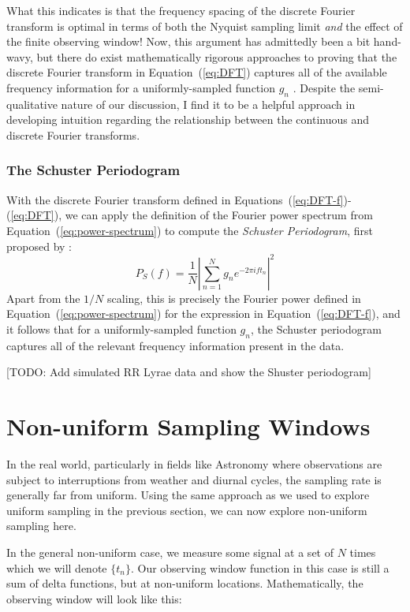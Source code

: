\documentclass[preprint]{aastex}
\newcommand{\todo}[1]{{\color{red} [TODO: #1]}}
\newcommand{\Eq}[1]{Equation~(\ref{eq:#1})}
\newcommand{\eq}[1]{\Eq{#1}}
\newcommand{\eqs}[2]{Equations~(\ref{eq:#1})-(\ref{eq:#2})}
\newcommand{\eqlabel}[1]{\label{eq:#1}}
\begin{document}
What this indicates is that the frequency spacing of the discrete Fourier
transform is optimal in terms of both the Nyquist sampling limit
{\it and} the effect of the finite observing window!
Now, this argument has admittedly been a bit hand-wavy, but there do exist
mathematically rigorous approaches to proving that the discrete Fourier
transform in \eq{DFT} captures all of the available frequency information
for a uniformly-sampled function $g_n$
\citep[see, e.g.][]{FoundationsOfSignalProcessing}.
Despite the semi-qualitative nature of our discussion,
I find it to be a helpful approach
in developing intuition regarding the relationship between the
continuous and discrete Fourier transforms.

\subsubsection{The Schuster Periodogram}

With the discrete Fourier transform defined in \eqs{DFT-f}{DFT}, we can
apply the definition of the Fourier power spectrum from \eq{power-spectrum}
to compute the {\it Schuster Periodogram}, first proposed by \citet{Schuster98}:
\begin{equation}
  P_S(f) = \frac{1}{N}\left|\sum_{n=1}^N g_n e^{-2\pi i f t_n}\right|^2
  \eqlabel{schuster-periodogram}
\end{equation}
Apart from the $1/N$ scaling, this is precisely the Fourier power defined
in \eq{power-spectrum} for the expression in \eq{DFT-f}, and it follows that
for a uniformly-sampled function $g_n$, the Schuster periodogram captures
all of the relevant frequency information present in the data.

\todo{Add simulated RR Lyrae data and show the Shuster periodogram}


\section{Non-uniform Sampling Windows}

In the real world, particularly in fields like Astronomy where observations are
subject to interruptions from weather and diurnal cycles, the sampling rate
is generally far from uniform.
Using the same approach as we used to explore uniform sampling in the previous
section, we can now explore non-uniform sampling here.

In the general non-uniform case, we measure some signal at a set of $N$ times
which we will denote $\{t_n\}$.
Our observing window function in this case is still a sum of delta functions,
but at non-uniform locations.
Mathematically, the observing window will look like this:
\end{document}
